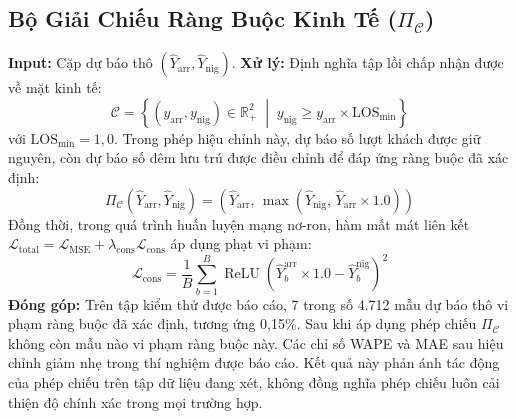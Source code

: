 \documentclass[10pt,journal,compsoc]{IEEEtran}
\begin{document}
\subsection{Bộ Giải Chiếu Ràng Buộc Kinh Tế ($\Pi_{\mathcal{C}}$)}
\noindent \textbf{Input:} Cặp dự báo thô $(\hat{Y}_{\text{arr}}, \hat{Y}_{\text{nig}})$.
\noindent \textbf{Xử lý:} Định nghĩa tập lồi chấp nhận được về mặt kinh tế:
\begin{equation}
\mathcal{C} = \left\{(y_{\text{arr}}, y_{\text{nig}}) \in \mathbb{R}_+^2 \;\middle|\; y_{\text{nig}} \ge y_{\text{arr}} \times \text{LOS}_{\min} \right\}
\end{equation}
với $\text{LOS}_{\min} = 1,0$. Trong phép hiệu chỉnh này, dự báo số lượt khách được giữ nguyên, còn dự báo số đêm lưu trú được điều chỉnh để đáp ứng ràng buộc đã xác định:
\begin{equation}
\Pi_{\mathcal{C}}(\hat{Y}_{\text{arr}}, \hat{Y}_{\text{nig}}) = \left(\hat{Y}_{\text{arr}}, \, \max\left(\hat{Y}_{\text{nig}}, \, \hat{Y}_{\text{arr}} \times 1.0\right)\right)
\end{equation}
Đồng thời, trong quá trình huấn luyện mạng nơ-ron, hàm mất mát liên kết $\mathcal{L}_{\text{total}} = \mathcal{L}_{\text{MSE}} + \lambda_{\text{cons}} \mathcal{L}_{\text{cons}}$ áp dụng phạt vi phạm:
\begin{equation}
\mathcal{L}_{\text{cons}} = \frac{1}{B} \sum_{b=1}^B \operatorname{ReLU}\left(\hat{Y}_{b}^{\text{arr}} \times 1.0 - \hat{Y}_{b}^{\text{nig}}\right)^2
\end{equation}
\noindent \textbf{Đóng góp:} Trên tập kiểm thử được báo cáo, 7 trong số 4.712 mẫu dự báo thô vi phạm ràng buộc đã xác định, tương ứng 0,15\%.  Sau khi áp dụng phép chiếu  $\Pi_{\mathcal{C}}$ không còn mẫu nào vi phạm ràng buộc này. Các chỉ số WAPE và MAE sau hiệu chỉnh giảm nhẹ trong thí nghiệm được báo cáo. Kết quả này phản ánh tác động của phép chiếu trên tập dữ liệu đang xét, không đồng nghĩa phép chiếu luôn cải thiện độ chính xác trong mọi trường hợp.
\end{document}
